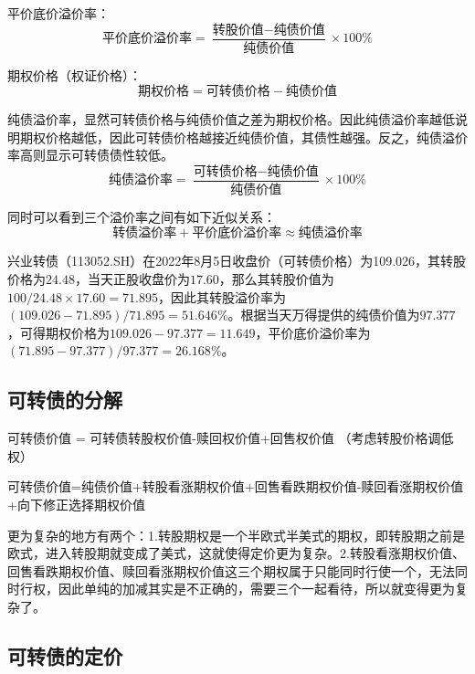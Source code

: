 \documentclass[11pt]{article}
\begin{document}
平价底价溢价率：
\begin{equation*}
    \text{平价底价溢价率} = \frac{\text{转股价值} - \text{纯债价值}}{\text{纯债价值}} \times 100\%
\end{equation*}

期权价格（权证价格）：
\begin{equation*}
    \text{期权价格} = \text{可转债价格} - \text{纯债价值}
\end{equation*}

纯债溢价率，显然可转债价格与纯债价值之差为期权价格。因此纯债溢价率越低说明期权价格越低，因此可转债价格越接近纯债价值，其债性越强。反之，纯债溢价率高则显示可转债债性较低。
\begin{equation*}
    \text{纯债溢价率} = \frac{\text{可转债价格} - \text{纯债价值}}{\text{纯债价值}} \times 100\%
\end{equation*}

同时可以看到三个溢价率之间有如下近似关系：
\begin{equation*}
    \text{转债溢价率} + \text{平价底价溢价率} \approx \text{纯债溢价率}
\end{equation*}

\begin{example}
    兴业转债（113052.SH）在2022年8月5日收盘价（可转债价格）为109.026，其转股价格为$24.48$，当天正股收盘价为$17.60$，那么其转股价值为$100/24.48 \times 17.60 = 71.895$，因此其转股溢价率为$(109.026-71.895)/71.895 = 51.646\%$。根据当天万得提供的纯债价值为$97.377$，可得期权价格为$109.026-97.377 = 11.649$，平价底价溢价率为$(71.895-97.377)/97.377 = 26.168\%$。
\end{example}

\subsection{可转债的分解}

可转债价值 = 可转债转股权价值-赎回权价值+回售权价值 （考虑转股价格调低权）


可转债价值=纯债价值+转股看涨期权价值+回售看跌期权价值-赎回看涨期权价值+向下修正选择期权价值


更为复杂的地方有两个：1.转股期权是一个半欧式半美式的期权，即转股期之前是欧式，进入转股期就变成了美式，这就使得定价更为复杂。2.转股看涨期权价值、回售看跌期权价值、赎回看涨期权价值这三个期权属于只能同时行使一个，无法同时行权，因此单纯的加减其实是不正确的，需要三个一起看待，所以就变得更为复杂了。

\subsection{可转债的定价}
\end{document}
